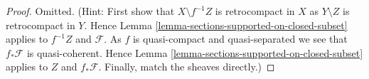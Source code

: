 \begin{proof}
Omitted. (Hint: First show that $X \setminus f^{-1}Z$ is retrocompact
in $X$ as $Y \setminus Z$ is retrocompact in $Y$. Hence
Lemma \ref{lemma-sections-supported-on-closed-subset}
applies to $f^{-1}Z$ and $\mathcal{F}$. As $f$ is quasi-compact and
quasi-separated we see that $f_*\mathcal{F}$ is quasi-coherent.
Hence Lemma \ref{lemma-sections-supported-on-closed-subset}
applies to $Z$ and $f_*\mathcal{F}$. Finally, match the sheaves
directly.)
\end{proof}








